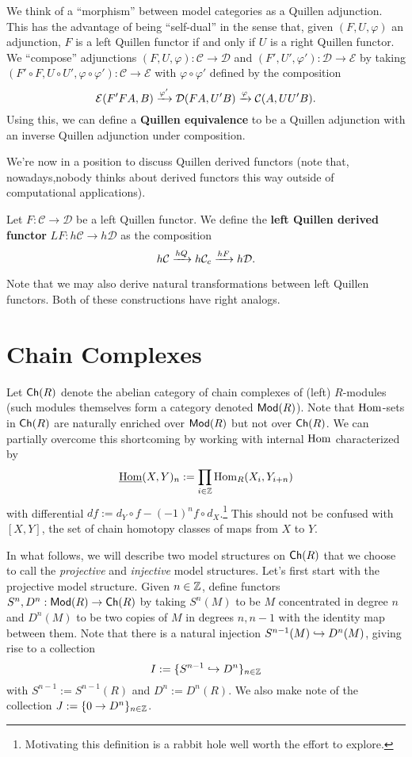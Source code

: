 \documentclass[11pt]{article}
\renewcommand{\C}{\mathcal{C}}
\newcommand{\D}{\mathcal{D}}
\newcommand{\E}{\mathcal{E}}
\renewcommand{\phi}{\varphi}
\begin{document}
We think of a ``morphism'' between model categories as a Quillen adjunction. This has the advantage of being ``self-dual'' in the sense that, given $(F,U,\phi)$ an adjunction, $F$ is a left Quillen functor if and only if $U$ is a right Quillen functor. We ``compose'' adjunctions $(F,U,\phi): \C\to\D$ and $(F',U',\phi'): \D\to\E$ by taking $(F'\circ F,U\circ U',\phi\circ\phi'): \C\to\E$ with $\phi\circ\phi'$ defined by the composition 
$$\E(F'FA,B)\xto{\phi'}\D(FA,U'B)\xto{\phi}\C(A,UU'B).$$
Using this, we can define a \textbf{Quillen equivalence} to be a Quillen adjunction with an inverse Quillen adjunction under composition.

We're now in a position to discuss Quillen derived functors (note that, nowadays,nobody thinks about derived functors this way outside of computational applications). 

\begin{definition}
Let $F: \C\to\D$ be a left Quillen functor. We define the \textbf{left Quillen derived functor} $LF: h\C\to h\D$ as the composition
$$h\C\xto{hQ}h\C_c\xto{hF}h\D.$$
\end{definition}

Note that we may also derive natural transformations between left Quillen functors. Both of these constructions have right analogs.

\section{Chain Complexes}
Let $\operatorname{\mathsf{Ch}}(R)$ denote the abelian category of chain complexes of (left) $R$-modules (such modules themselves form a category denoted $\operatorname{\mathsf{Mod}}(R)$). Note that $\operatorname{Hom}$-sets in $\operatorname{\mathsf{Ch}}(R)$ are naturally enriched over $\operatorname{\mathsf{Mod}}(R)$ but not over $\operatorname{\mathsf{Ch}}(R)$. We can partially overcome this shortcoming by working with internal $\operatorname{Hom}$ characterized by 
$$\underline{\operatorname{Hom}}(X,Y)_n:=\prod_{i\in\mathbb{Z}}\operatorname{Hom}_R(X_i,Y_{i+n})$$
with differential $df:=d_Y\circ f-(-1)^nf\circ d_X$.\footnote{Motivating this definition is a rabbit hole well worth the effort to explore.} This should not be confused with $[X,Y]$, the set of chain homotopy classes of maps from $X$ to $Y$.

In what follows, we will describe two model structures on $\operatorname{\mathsf{Ch}}(R)$ that we choose to call the \emph{projective} and \emph{injective} model structures. Let's first start with the projective model structure. Given $n\in\mathbb{Z}$, define functors $S^n,D^n: \operatorname{\mathsf{Mod}}(R)\to\operatorname{\mathsf{Ch}}(R)$ by taking $S^n(M)$ to be $M$ concentrated in degree $n$ and $D^n(M)$ to be two copies of $M$ in degrees $n,n-1$ with the identity map between them. Note that there is a natural injection $S^{n-1}(M)\hookrightarrow D^n(M)$, giving rise to a collection 
$$I:=\{S^{n-1}\hookrightarrow D^n\}_{n\in\mathbb{Z}}$$
with $S^{n-1}:=S^{n-1}(R)$ and $D^n:=D^n(R)$. We also make note of the collection $J:=\{0\to D^n\}_{n\in\mathbb{Z}}$. 
\end{document}
